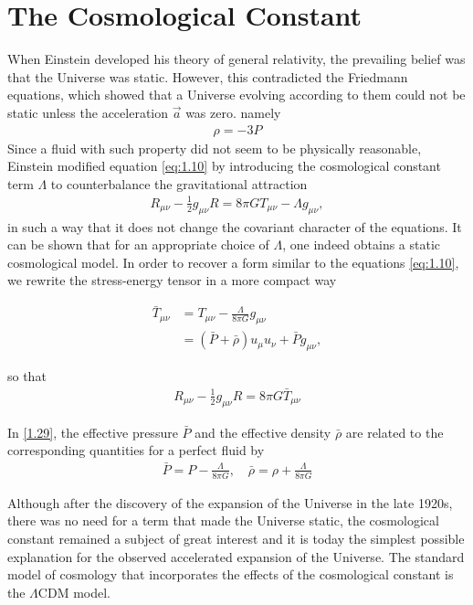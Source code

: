 
\section{The Cosmological Constant}
\hspace{0.5cm}When Einstein developed his theory of general relativity, the prevailing belief was that the Universe was static. However, this contradicted the Friedmann equations, which showed that a Universe
evolving according to them could not be static unless the acceleration  $\vec{a}$ was zero. namely
\begin{align}
   \rho=-3 P \label{1.26}
\end{align}
Since a fluid with such property did not seem to be physically reasonable, Einstein modified equation \ref{eq:1.10} by introducing the cosmological constant term $\Lambda$ to counterbalance the gravitational attraction
\begin{align}
    R_{\mu \nu}-\frac{1}{2} g_{\mu \nu} R=8 \pi G T_{\mu \nu}-\Lambda g_{\mu \nu},\label{1.27}
\end{align}
 in such a way that it does not change the covariant character of the equations. It can be shown that for an appropriate choice of $\Lambda$, one indeed obtains a static cosmological model.
In order to recover a form similar to the equations \ref{eq:1.10}, we rewrite the stress-energy tensor in a more compact way

\begin{align}
    \bar{T}_{\mu \nu} & =T_{\mu \nu}-\frac{\Lambda}{8 \pi G} g_{\mu \nu} \\ & =(\bar{P}+\bar{\rho}) u_\mu u_\nu+\bar{P} g_{\mu \nu}, \label{1.29}
\end{align}

so that
\begin{align}
    R_{\mu \nu}-\frac{1}{2} g_{\mu \nu} R=8 \pi G \bar{T}_{\mu \nu}\label{1.30}
\end{align}


In \ref{1.29}, the effective pressure $\bar{P}$ and the effective density $\bar{\rho}$ are related to the corresponding quantities for a perfect fluid by
\begin{align}
    \bar{P}=P-\frac{\Lambda}{8 \pi G}, \quad \bar{\rho}=\rho+\frac{\Lambda}{8 \pi G}\label{1.31}
\end{align}

Although after the discovery of the expansion of the Universe in the late 1920s, there was no need for a term that made the Universe static, the cosmological constant remained a subject of great interest and it is today the simplest possible explanation for the observed accelerated expansion of the Universe. The standard model of cosmology that incorporates the effects of the cosmological constant is the $\Lambda$CDM model.

